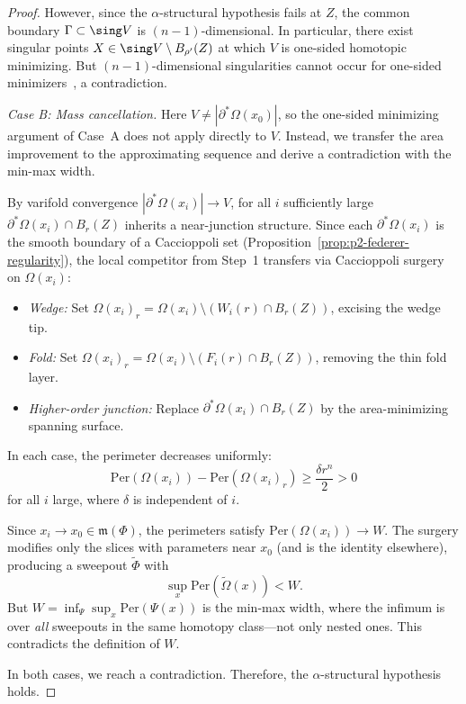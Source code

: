 \begin{proof}
However, since the $\alpha$-structural hypothesis fails at $Z$, the common boundary $\Gamma \subset \sing V$ is $(n-1)$-dimensional. In particular, there exist singular points $X \in \sing V \setminus B_{\rho'}(Z)$ at which $V$ is one-sided homotopic minimizing. But $(n-1)$-dimensional singularities cannot occur for one-sided minimizers~\cite{Liu19}, a contradiction.

\medskip\noindent\emph{Case B: Mass cancellation.}
Here $V \neq |\partial^*\Omega(x_0)|$, so the one-sided minimizing argument of Case~A does not apply directly to $V$. Instead, we transfer the area improvement to the approximating sequence and derive a contradiction with the min-max width.

By varifold convergence $|\partial^*\Omega(x_i)| \to V$, for all $i$ sufficiently large $\partial^*\Omega(x_i) \cap B_r(Z)$ inherits a near-junction structure. Since each $\partial^*\Omega(x_i)$ is the smooth boundary of a Caccioppoli set (Proposition~\ref{prop:p2-federer-regularity}), the local competitor from Step~1 transfers via Caccioppoli surgery on $\Omega(x_i)$:
\begin{itemize}
    \item \emph{Wedge:} Set $\Omega(x_i)_r = \Omega(x_i) \setminus (W_i(r) \cap B_r(Z))$, excising the wedge tip.
    \item \emph{Fold:} Set $\Omega(x_i)_r = \Omega(x_i) \setminus (F_i(r) \cap B_r(Z))$, removing the thin fold layer.
    \item \emph{Higher-order junction:} Replace $\partial^*\Omega(x_i) \cap B_r(Z)$ by the area-minimizing spanning surface.
\end{itemize}
In each case, the perimeter decreases uniformly:
\[
    \mathrm{Per}(\Omega(x_i)) - \mathrm{Per}(\Omega(x_i)_r) \geq \frac{\delta r^n}{2} > 0
\]
for all $i$ large, where $\delta$ is independent of $i$.

Since $x_i \to x_0 \in \mathfrak{m}(\Phi)$, the perimeters satisfy $\mathrm{Per}(\Omega(x_i)) \to W$. The surgery modifies only the slices with parameters near $x_0$ (and is the identity elsewhere), producing a sweepout $\tilde{\Phi}$ with
\[
    \sup_x \mathrm{Per}(\tilde{\Omega}(x)) < W.
\]
But $W = \inf_{\Psi} \sup_x \mathrm{Per}(\Psi(x))$ is the min-max width, where the infimum is over \emph{all} sweepouts in the same homotopy class---not only nested ones. This contradicts the definition of $W$.

\medskip
In both cases, we reach a contradiction. Therefore, the $\alpha$-structural hypothesis holds.
\end{proof}

